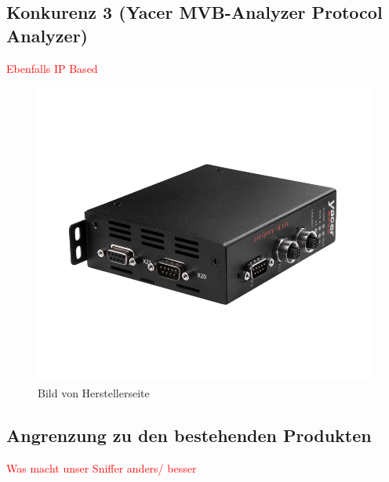 
\subsection{Konkurenz 3 (Yacer MVB-Analyzer Protocol Analyzer)}
\textcolor{red}{Ebenfalls IP Based}

\begin{figure}[H]
    \centering
    \includegraphics[width=0.5\linewidth]{Figures/Chap3/Konkurenz/Yacer.jpg}
    \caption{Bild von Herstellerseite}
    \label{fig:YacerAnalyzer}
\end{figure}



\subsection{Angrenzung zu den bestehenden Produkten}
\textcolor{red}{Was macht unser Sniffer anders/ besser}

